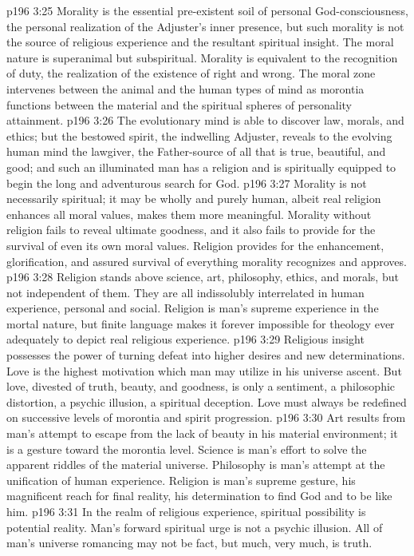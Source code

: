 \vs p196 3:25 Morality is the essential pre\hyp{}existent soil of personal God\hyp{}consciousness, the personal realization of the Adjuster’s inner presence, but such morality is not the source of religious experience and the resultant spiritual insight. The moral nature is superanimal but subspiritual. Morality is equivalent to the recognition of duty, the realization of the existence of right and wrong. The moral zone intervenes between the animal and the human types of mind as morontia functions between the material and the spiritual spheres of personality attainment.
\vs p196 3:26 The evolutionary mind is able to discover law, morals, and ethics; but the bestowed spirit, the indwelling Adjuster, reveals to the evolving human mind the lawgiver, the Father\hyp{}source of all that is true, beautiful, and good; and such an illuminated man has a religion and is spiritually equipped to begin the long and adventurous search for God.
\vs p196 3:27 Morality is not necessarily spiritual; it may be wholly and purely human, albeit real religion enhances all moral values, makes them more meaningful. Morality without religion fails to reveal ultimate goodness, and it also fails to provide for the survival of even its own moral values. Religion provides for the enhancement, glorification, and assured survival of everything morality recognizes and approves.
\vs p196 3:28 Religion stands above science, art, philosophy, ethics, and morals, but not independent of them. They are all indissolubly interrelated in human experience, personal and social. Religion is man’s supreme experience in the mortal nature, but finite language makes it forever impossible for theology ever adequately to depict real religious experience.
\pc \vs p196 3:29 Religious insight possesses the power of turning defeat into higher desires and new determinations. Love is the highest motivation which man may utilize in his universe ascent. But love, divested of truth, beauty, and goodness, is only a sentiment, a philosophic distortion, a psychic illusion, a spiritual deception. Love must always be redefined on successive levels of morontia and spirit progression.
\pc \vs p196 3:30 Art results from man’s attempt to escape from the lack of beauty in his material environment; it is a gesture toward the morontia level. Science is man’s effort to solve the apparent riddles of the material universe. Philosophy is man’s attempt at the unification of human experience. Religion is man’s supreme gesture, his magnificent reach for final reality, his determination to find God and to be like him.
\pc \vs p196 3:31 In the realm of religious experience, spiritual possibility is potential reality. Man’s forward spiritual urge is not a psychic illusion. All of man’s universe romancing may not be fact, but much, very much, is truth.
